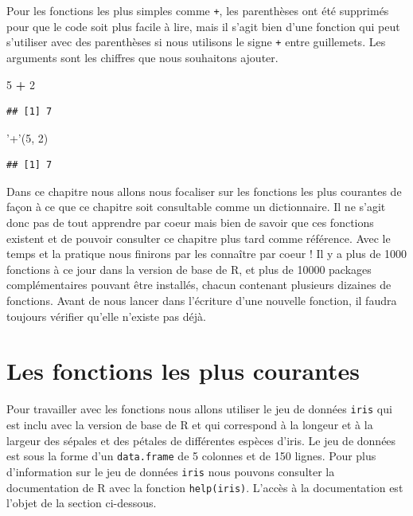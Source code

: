 \documentclass[]{book}
\newenvironment{Shaded}{\begin{snugshade}}{\end{snugshade}}
\newcommand{\DecValTok}[1]{\textcolor[rgb]{0.00,0.00,0.81}{#1}}
\newcommand{\NormalTok}[1]{#1}
\newcommand{\OperatorTok}[1]{\textcolor[rgb]{0.81,0.36,0.00}{\textbf{#1}}}
\newcommand{\StringTok}[1]{\textcolor[rgb]{0.31,0.60,0.02}{#1}}
\begin{document}
Pour les fonctions les plus simples comme \texttt{+}, les parenthèses ont été supprimés pour que le code soit plus facile à lire, mais il s'agit bien d'une fonction qui peut s'utiliser avec des parenthèses si nous utilisons le signe \texttt{+} entre guillemets. Les arguments sont les chiffres que nous souhaitons ajouter.

\begin{Shaded}
\begin{Highlighting}[]
\DecValTok{5} \OperatorTok{+}\StringTok{ }\DecValTok{2}
\end{Highlighting}
\end{Shaded}

\begin{verbatim}
## [1] 7
\end{verbatim}

\begin{Shaded}
\begin{Highlighting}[]
\StringTok{'+'}\NormalTok{(}\DecValTok{5}\NormalTok{, }\DecValTok{2}\NormalTok{)}
\end{Highlighting}
\end{Shaded}

\begin{verbatim}
## [1] 7
\end{verbatim}

Dans ce chapitre nous allons nous focaliser sur les fonctions les plus courantes de façon à ce que ce chapitre soit consultable comme un dictionnaire. Il ne s'agit donc pas de tout apprendre par coeur mais bien de savoir que ces fonctions existent et de pouvoir consulter ce chapitre plus tard comme référence. Avec le temps et la pratique nous finirons par les connaître par coeur ! Il y a plus de 1000 fonctions à ce jour dans la version de base de R, et plus de 10000 packages complémentaires pouvant être installés, chacun contenant plusieurs dizaines de fonctions. Avant de nous lancer dans l'écriture d'une nouvelle fonction, il faudra toujours vérifier qu'elle n'existe pas déjà.

\hypertarget{l015mainfun}{%
\section{Les fonctions les plus courantes}\label{l015mainfun}}

Pour travailler avec les fonctions nous allons utiliser le jeu de données \texttt{iris} qui est inclu avec la version de base de R et qui correspond à la longeur et à la largeur des sépales et des pétales de différentes espèces d'iris. Le jeu de données est sous la forme d'un \texttt{data.frame} de 5 colonnes et de 150 lignes. Pour plus d'information sur le jeu de données \texttt{iris} nous pouvons consulter la documentation de R avec la fonction \texttt{help(iris)}. L'accès à la documentation est l'objet de la section ci-dessous.
\end{document}
